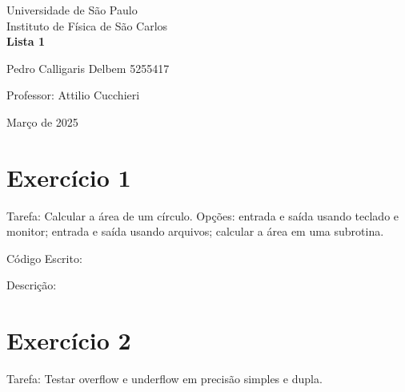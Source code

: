 \documentclass[12pt, a4paper]{article} %
\begin{document}
	
	\begin{titlepage}
		\begin{center}
\Huge{Universidade de São Paulo}\\
\large{Instituto de Física de São Carlos}\\
\vspace{20pt}
\vspace{200pt}
\textbf{Lista 1}\\
\vspace{8cm}
		\end{center}

\begin{flushleft}
\begin{tabbing}
Pedro Calligaris Delbem 5255417\\
\end{tabbing}
\vspace{0.5cm}
Professor: Attilio Cucchieri\\		
		\end{flushleft}
	
		\begin{center}
			\vspace{\fill}
	Março de 2025	
		\end{center}
	\end{titlepage}

	\tableofcontents 
	\thispagestyle{empty}
	\newpage
\section{Exerc\'icio 1}

Tarefa: Calcular a \'area de um c\'irculo. Op\c{c}\~oes: entrada e sa\'ida usando teclado e monitor; entrada e sa\'ida usando arquivos; calcular a  \'area em uma subrotina.

C\'odigo Escrito:


Descri\c{c}\~ao:

\section{Exerc\'icio 2}

Tarefa: Testar overflow e underflow em precis\~ao simples e dupla.
\end{document}
